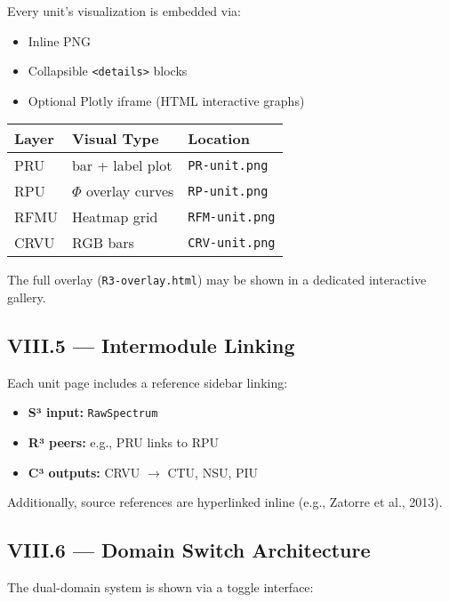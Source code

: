 \documentclass{article}
\begin{document}
Every unit’s visualization is embedded via:

\begin{itemize}
    \item Inline PNG
    \item Collapsible \texttt{<details>} blocks
    \item Optional Plotly iframe (HTML interactive graphs)
\end{itemize}

\begin{center}
\begin{tabular}{|l|l|l|}
\hline
\textbf{Layer} & \textbf{Visual Type} & \textbf{Location} \\
\hline
PRU & bar + label plot & \texttt{PR-unit.png} \\
RPU & $\Phi$ overlay curves & \texttt{RP-unit.png} \\
RFMU & Heatmap grid & \texttt{RFM-unit.png} \\
CRVU & RGB bars & \texttt{CRV-unit.png} \\
\hline
\end{tabular}
\end{center}

The full overlay (\texttt{R3-overlay.html}) may be shown in a dedicated interactive gallery.

\subsection*{VIII.5 — Intermodule Linking}

Each unit page includes a reference sidebar linking:

\begin{itemize}
    \item \textbf{S³ input:} \texttt{RawSpectrum}
    \item \textbf{R³ peers:} e.g., PRU links to RPU
    \item \textbf{C³ outputs:} CRVU $\rightarrow$ CTU, NSU, PIU
\end{itemize}

Additionally, source references are hyperlinked inline (e.g., Zatorre et al., 2013).

\subsection*{VIII.6 — Domain Switch Architecture}

The dual-domain system is shown via a toggle interface:
\end{document}
